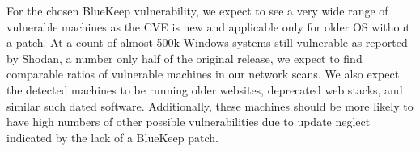 For the chosen BlueKeep vulnerability, we expect to see a very wide range of vulnerable machines as the CVE is new and applicable only for older OS without a patch. At a count of almost 500k Windows systems still vulnerable as reported by Shodan, a number only half of the original release, we expect to find comparable ratios of vulnerable machines in our network scans. We also expect the detected machines to be running older websites, deprecated web stacks, and similar such dated software. Additionally, these machines should be more likely to have high numbers of other possible vulnerabilities due to update neglect indicated by the lack of a BlueKeep patch.
